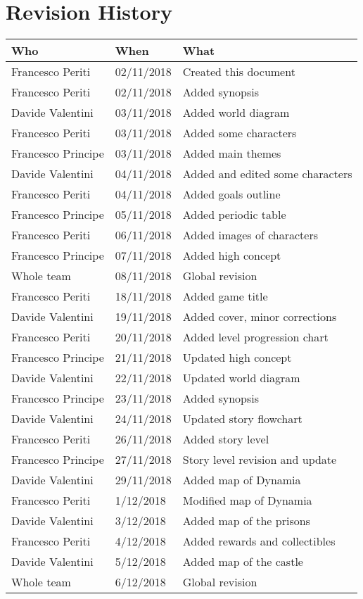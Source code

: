 \chapter*{Revision History}

\begin{longtable}[H]{|l|l|l|}
\hline
\cellcolor{lightgray}\textbf{Who} & \cellcolor{lightgray}\textbf{When} & \cellcolor{lightgray}\textbf{What} \\ \hline
Francesco Periti & 02/11/2018 & Created this document \\ \hline
Francesco Periti & 02/11/2018 & Added synopsis \\ \hline
Davide Valentini & 03/11/2018 & Added world diagram \\ \hline
Francesco Periti & 03/11/2018 & Added some characters \\ \hline
Francesco Principe & 03/11/2018 & Added main themes \\ \hline
Davide Valentini & 04/11/2018 & Added and edited some characters \\ \hline
Francesco Periti & 04/11/2018 & Added goals outline \\ \hline
Francesco Principe & 05/11/2018 & Added periodic table \\ \hline
Francesco Periti & 06/11/2018 & Added images of characters \\ \hline
Francesco Principe & 07/11/2018 & Added high concept \\ \hline
Whole team & 08/11/2018 & Global revision \\ \hline

Francesco Periti & 18/11/2018 & Added game title \\ \hline
Davide Valentini & 19/11/2018 & Added cover, minor corrections \\ \hline
Francesco Periti & 20/11/2018 & Added level progression chart \\ \hline
Francesco Principe & 21/11/2018 & Updated high concept \\ \hline
Davide Valentini & 22/11/2018 & Updated world diagram \\ \hline
Francesco Principe & 23/11/2018 & Added synopsis \\ \hline
Davide Valentini & 24/11/2018 & Updated story flowchart \\ \hline
Francesco Periti & 26/11/2018 & Added story level \\ \hline
Francesco Principe & 27/11/2018 & Story level revision and update \\ \hline
Davide Valentini & 29/11/2018 & Added map of Dynamia \\ \hline
Francesco Periti & 1/12/2018 & Modified map of Dynamia \\ \hline
Davide Valentini & 3/12/2018 & Added map of the prisons \\ \hline
Francesco Periti & 4/12/2018 & Added rewards and collectibles \\ \hline
Davide Valentini & 5/12/2018 & Added map of the castle \\ \hline
Whole team & 6/12/2018 & Global revision \\ \hline


\end{longtable}
